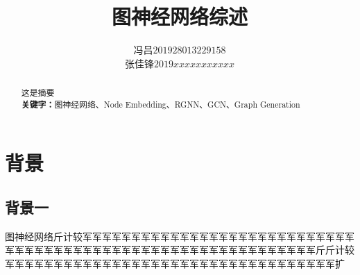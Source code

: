 \documentclass{ctexart}
\title{图神经网络综述}
\author{\begin{tabular}{ll}冯吕 & $201928013229158$\\
	张佳锋 & $2019xxxxxxxxxxx$
\end{tabular}}
\date{}
\begin{document}
\maketitle
{}
\begin{abstract}
 这是摘要\\

\centering
\textbf{关键字：}图神经网络、Node Embedding、RGNN、GCN、Graph Generation
\end{abstract}


\section{背景}
\subsection{背景一}
图神经网络斤计较军军军军军军军军军军军军军军军军军军军军军军军军军军军军军军军军军军军军军军军军军军军军军军军军军军军军军军军军军军军军斤斤计较军军军军军军军军军军军军军军军军军军军军军军军军军军军军军军军军军军扩
\end{document}
